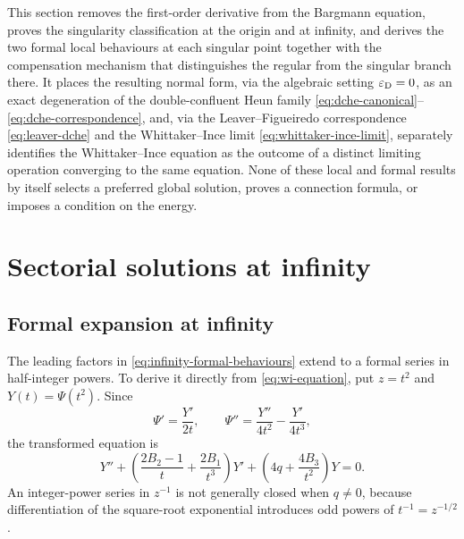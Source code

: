 \documentclass[11pt]{article}
\theoremstyle{remark}
\begin{document}
This section removes the first-order derivative from the Bargmann equation,
proves the singularity classification at the origin and at infinity, and
derives the two formal local behaviours at each singular point together
with the compensation mechanism that distinguishes the regular from the
singular branch there.  It places the resulting normal form, via the
algebraic setting \(\varepsilon_{\rm D}=0\), as an exact degeneration of
the double-confluent Heun family
\eqref{eq:dche-canonical}--\eqref{eq:dche-correspondence}, and, via the
Leaver--Figueiredo correspondence \eqref{eq:leaver-dche} and the
Whittaker--Ince limit \eqref{eq:whittaker-ince-limit}, separately
identifies the Whittaker--Ince equation as the outcome of a distinct
limiting operation converging to the same equation.
None of these local and formal results by itself selects a preferred global
solution, proves a connection formula, or imposes a condition on the
energy.

\section{Sectorial solutions at infinity}
\label{sec:sectorial-infinity}

\subsection{Formal expansion at infinity}

The leading factors in \eqref{eq:infinity-formal-behaviours} extend to a
formal series in half-integer powers.  To derive it directly from
\eqref{eq:wi-equation}, put \(z=t^2\) and \(Y(t)=\Psi(t^2)\).  Since
\[
 \Psi'=\frac{Y'}{2t},\qquad
 \Psi''=\frac{Y''}{4t^2}-\frac{Y'}{4t^3},
\]
the transformed equation is
\begin{equation}
 Y''+\left(\frac{2B_2-1}{t}+\frac{2B_1}{t^3}\right)Y'
 +\left(4q+\frac{4B_3}{t^2}\right)Y=0.
 \label{eq:wi-t-equation}
\end{equation}
An integer-power series in \(z^{-1}\) is not generally closed when
\(q\ne0\), because differentiation of the square-root exponential introduces
odd powers of \(t^{-1}=z^{-1/2}\).
\end{document}
